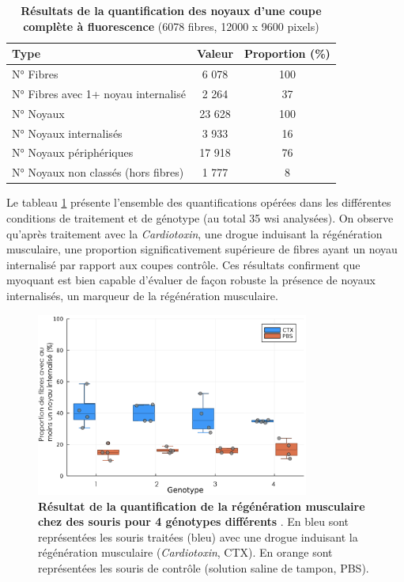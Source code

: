 \begin{table}[!ht]
\centering
\caption[Résultats de la quantification des noyaux d'une coupe complète à fluorescence]{\textbf{Résultats de la quantification des noyaux d'une coupe complète à fluorescence} (6078 fibres, 12000 x 9600 pixels)}
\label{tab:myoquant_fluo_results}
\begin{tabular}{|l|c|c|}
\hline
\textbf{Type} & \textbf{Valeur} & \textbf{Proportion (\%)} \\
\hline
N° Fibres & 6 078 & 100 \\
\hline
N° Fibres avec 1+ noyau internalisé & 2 264 & 37 \\
\hline
\hline
N° Noyaux & 23 628 & 100 \\
\hline
N° Noyaux internalisés & 3 933 & 16 \\
\hline
N° Noyaux périphériques & 17 918 & 76 \\
\hline
N° Noyaux non classés (hors fibres) & 1 777 & 8 \\
\hline
\end{tabular}
\end{table}
Le tableau \ref{fig:fluo_compil} présente l'ensemble des quantifications opérées dans les différentes conditions de traitement et de génotype (au total 35 \gls{wsi} analysées). On observe qu'après traitement avec la \textit{Cardiotoxin}, une drogue induisant la régénération musculaire, une proportion significativement supérieure de fibres ayant un noyau internalisé par rapport aux coupes contrôle. Ces résultats confirment que \gls{myoquant} est bien capable d'évaluer de façon robuste la présence de noyaux internalisés, un marqueur de la régénération musculaire.

\begin{figure}[!ht]
 \centering
 \includegraphics[width=0.8\textwidth]{figures/fluo_compil.png}
 \caption[Résultat de la quantification de la régénération musculaire]{\textbf{Résultat de la quantification de la régénération musculaire chez des souris pour 4 génotypes différents }. En bleu sont représentées les souris traitées (bleu) avec une drogue induisant la régénération musculaire (\textit{Cardiotoxin}, CTX). En orange sont représentées les souris de contrôle (solution saline de tampon, PBS).}
 \label{fig:fluo_compil}
\end{figure}

